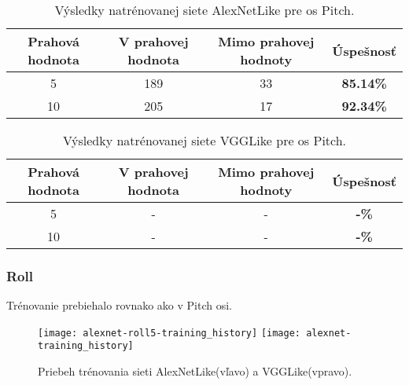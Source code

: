 \begin{table}[H]
    \centering
    \begin{tabular}{|c|c|c|c|}
        \hline
        Prahová hodnota & V prahovej hodnota       & Mimo prahovej hodnoty    & Úspešnosť    \\ \hline
        5               & {\color[HTML]{009901} 189} & {\color[HTML]{9A0000} 33} & \textbf{85.14\%} \\ \hline
        10              & {\color[HTML]{009901} 205} & {\color[HTML]{9A0000} 17} & \textbf{92.34\%} \\ \hline
    \end{tabular}
    \caption{Výsledky natrénovanej siete AlexNetLike pre os Pitch.}
    \label{tab:alexnetpitchresults}
\end{table}
\begin{table}[H]
    \centering
    \begin{tabular}{|c|c|c|c|}
        \hline
        Prahová hodnota & V prahovej hodnota       & Mimo prahovej hodnoty    & Úspešnosť    \\ \hline
        5               & {\color[HTML]{009901} -} & {\color[HTML]{9A0000} -} & \textbf{-\%} \\ \hline
        10              & {\color[HTML]{009901} -} & {\color[HTML]{9A0000} -} & \textbf{-\%} \\ \hline
    \end{tabular}
    \caption{Výsledky natrénovanej siete VGGLike pre os Pitch.}
    \label{tab:vgglikepitchresults}
\end{table}


\subsubsection{Roll}
Trénovanie prebiehalo rovnako ako v Pitch osi.

\begin{figure}[H]
    \centering
    \texttt{[image: alexnet-roll5-training\_history]} %
	\texttt{[image: alexnet-training\_history]} %
	\caption{Priebeh trénovania sieti AlexNetLike(vľavo) a VGGLike(vpravo).}
	\label{pic:rollaxis}
\end{figure}

